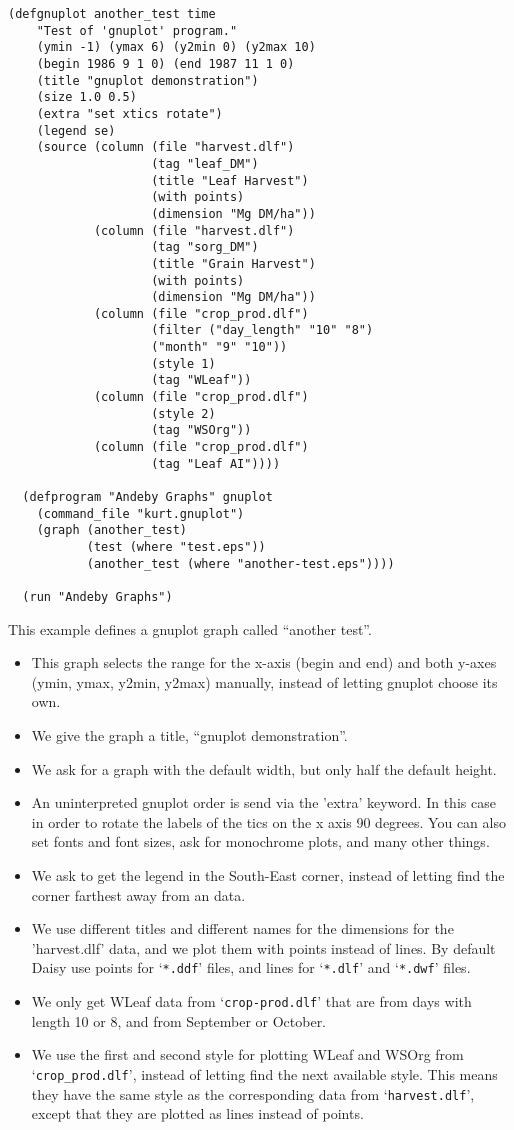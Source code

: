 \documentclass[a4paper,11pt]{article}
\begin{document}
\begin{verbatim}
(defgnuplot another_test time
    "Test of 'gnuplot' program."
    (ymin -1) (ymax 6) (y2min 0) (y2max 10)
    (begin 1986 9 1 0) (end 1987 11 1 0)
    (title "gnuplot demonstration")
    (size 1.0 0.5)
    (extra "set xtics rotate")
    (legend se)   
    (source (column (file "harvest.dlf")
                    (tag "leaf_DM")
                    (title "Leaf Harvest")
                    (with points)
                    (dimension "Mg DM/ha"))
            (column (file "harvest.dlf")
                    (tag "sorg_DM")
                    (title "Grain Harvest")
                    (with points)
                    (dimension "Mg DM/ha"))
            (column (file "crop_prod.dlf")
                    (filter ("day_length" "10" "8")
                    ("month" "9" "10"))
                    (style 1)
                    (tag "WLeaf"))
            (column (file "crop_prod.dlf")
                    (style 2)
                    (tag "WSOrg"))
            (column (file "crop_prod.dlf")
                    (tag "Leaf AI"))))
            
  (defprogram "Andeby Graphs" gnuplot
    (command_file "kurt.gnuplot")
    (graph (another_test)
           (test (where "test.eps"))
           (another_test (where "another-test.eps"))))
  
  (run "Andeby Graphs")
\end{verbatim}  
This example defines a gnuplot graph called ``another test''.
\begin{itemize}
\item This graph selects the range for the x-axis (begin and end)
  and both y-axes (ymin, ymax, y2min, y2max) manually, instead of
  letting gnuplot choose its own.
\item We give the graph a title, ``gnuplot demonstration''.
\item We ask for a graph with the default width, but only half the
  default height.
\item An uninterpreted gnuplot order is send via the 'extra' keyword.
  In this case in order to rotate the labels of the tics on the x axis
  90 degrees.  You can also set fonts and font sizes, ask for
  monochrome plots, and many other things.
\item We ask to get the legend in the South-East corner, instead of
  letting \daisy{} find the corner farthest away from an data.  
\item We use different titles and different names for the dimensions
  for the 'harvest.dlf' data, and we plot them with points instead of
  lines.  By default Daisy use points for `\texttt{*.ddf}' files, and
  lines for `\texttt{*.dlf}' and `\texttt{*.dwf}' files.
\item We only get WLeaf data from `\texttt{crop-prod.dlf}' that are
  from days with length 10 or 8, and from September or October.
\item We use the first and second style for plotting WLeaf and WSOrg
  from `\texttt{crop\_prod.dlf}', instead of letting \daisy{} find the
  next available style.  This means they have the same style as the
  corresponding data from `\texttt{harvest.dlf}', except that they are
  plotted as lines instead of points.
\end{itemize}
\end{document}
